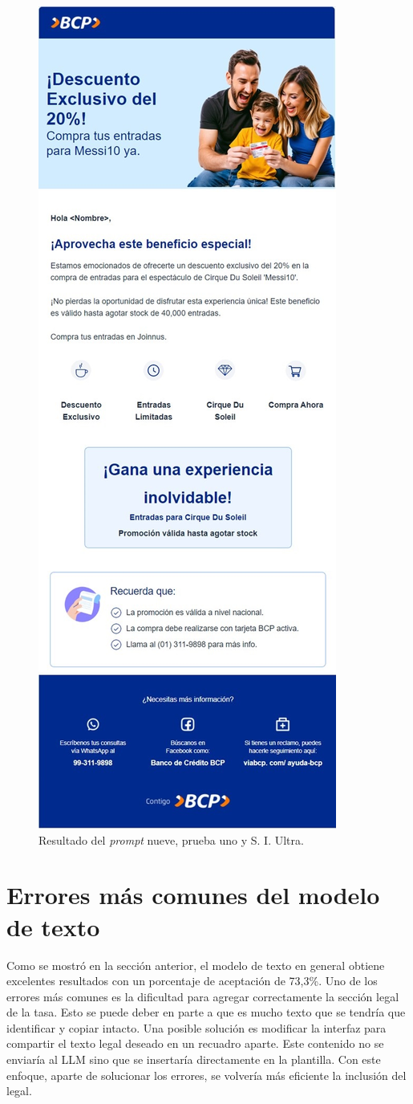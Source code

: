 \begin{figure}[H]
    \centering
    \includegraphics[width=0.6\linewidth]{Figures/Prueba_9_1_ultra.JPG}
    \caption{Resultado del \textit{prompt} nueve, prueba uno y S. I. Ultra.}
    \label{fig:prueba_9_1}
\end{figure}

\section{Errores más comunes del modelo de texto}

Como se mostró en la sección anterior, el modelo de texto en general obtiene excelentes resultados con un porcentaje de aceptación de 73,3\%. Uno de los errores más comunes es la dificultad para agregar correctamente la sección legal de la tasa. Esto se puede deber en parte a que es mucho texto que se tendría que identificar y copiar intacto. Una posible solución es modificar la interfaz para compartir el texto legal deseado en un recuadro aparte. Este contenido no se enviaría al LLM sino que se insertaría directamente en la plantilla. Con este enfoque, aparte de solucionar los errores, se volvería más eficiente la inclusión del legal.

